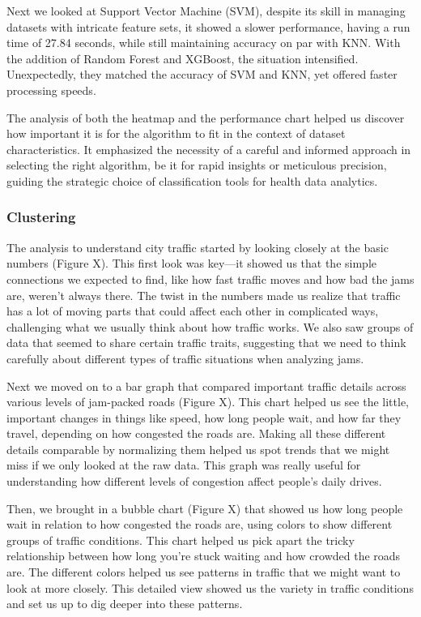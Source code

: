\documentclass{article}
\begin{document}
\begin{multicols}{2}
Next we looked at Support Vector Machine (SVM), despite its skill in managing datasets with intricate feature sets, it showed a slower performance, having a run time of 27.84 seconds, while still maintaining accuracy on par with KNN. With the addition of Random Forest and XGBoost, the situation intensified. Unexpectedly, they matched the accuracy of SVM and KNN, yet offered faster processing speeds.

The analysis of both the heatmap and the performance chart helped us discover how important it is for the algorithm to fit in the context of dataset characteristics. It emphasized the necessity of a careful and informed approach in selecting the right algorithm, be it for rapid insights or meticulous precision, guiding the strategic choice of classification tools for health data analytics.


\subsubsection{Clustering}

The analysis to understand city traffic started by looking closely at the basic numbers (Figure X). This first look was key—it showed us that the simple connections we expected to find, like how fast traffic moves and how bad the jams are, weren't always there. The twist in the numbers made us realize that traffic has a lot of moving parts that could affect each other in complicated ways, challenging what we usually think about how traffic works. We also saw groups of data that seemed to share certain traffic traits, suggesting that we need to think carefully about different types of traffic situations when analyzing jams.

Next we moved on to a bar graph that compared important traffic details across various levels of jam-packed roads (Figure X). This chart helped us see the little, important changes in things like speed, how long people wait, and how far they travel, depending on how congested the roads are. Making all these different details comparable by normalizing them helped us spot trends that we might miss if we only looked at the raw data. This graph was really useful for understanding how different levels of congestion affect people's daily drives.

Then, we brought in a bubble chart (Figure X) that showed us how long people wait in relation to how congested the roads are, using colors to show different groups of traffic conditions. This chart helped us pick apart the tricky relationship between how long you're stuck waiting and how crowded the roads are. The different colors helped us see patterns in traffic that we might want to look at more closely. This detailed view showed us the variety in traffic conditions and set us up to dig deeper into these patterns.


\end{multicols}
\end{document}
